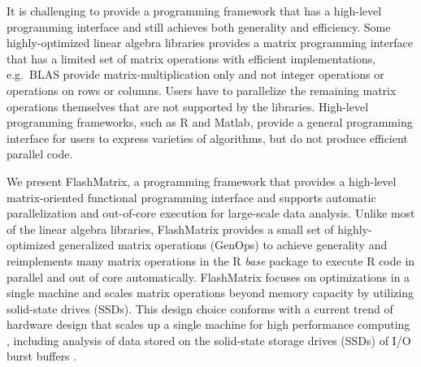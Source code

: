 
It is challenging to provide a programming framework that has a high-level
programming interface and still achieves both generality and efficiency.
Some highly-optimized linear algebra libraries \cite{mkl, openblas, elemental,
trilinos, petsc} provides a matrix programming interface that has a limited
set of matrix operations with efficient implementations, e.g.~BLAS provide
matrix-multiplication only and not integer operations or operations on rows
or columns. Users have to parallelize the remaining matrix
operations themselves that are not supported by the libraries. 
High-level programming frameworks, such as R and Matlab, provide a
general programming interface for users to express varieties of algorithms, but
do not produce efficient parallel code.


We present FlashMatrix, a programming framework that provides a high-level
matrix-oriented functional programming interface and supports automatic
parallelization and out-of-core execution for large-scale data analysis.
Unlike most of the linear algebra libraries, FlashMatrix provides a small
set of highly-optimized generalized matrix operations (GenOps) to achieve
generality and reimplements many matrix
operations in the R \textit{base} package to execute R code in parallel and
out of core automatically. FlashMatrix focuses on optimizations in
a single machine and scales matrix operations beyond memory capacity by utilizing
solid-state drives (SSDs). This design choice conforms with a current trend of
hardware design that scales up a single machine for high performance computing
\cite{Ang14}, including analysis of data stored on the 
solid-state storage drives (SSDs) of I/O burst buffers \cite{burst}.


